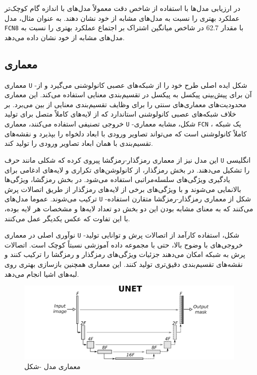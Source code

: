 در ارزیابی مدل‌ها با استفاده از شاخص دقت معمولاً مدل‌های با اندازه گام کوچک‌تر عملکرد بهتری را نسبت به مدل‌های مشابه از خود نشان دهند. به عنوان مثال، مدل
\verb*|FCN8|
با مقدار 62.7 در شاخص میانگین اشتراک بر اجتماع
عملکرد بهتری را نسبت به مدل‌های مشابه از خود نشان داده می‌دهد.

\subsection{معماری }

معماری
\verb*|U|
-شکل
\cite{ronneberger2015u}
ایده اصلی طرح خود را از شبکه‌های عصبی کانولوشنی می‌گیرد و از آن برای پیش‌بینی پیکسل به پیکسل
در تقسیم‌بندی معنایی استفاده می‌کند. این معماری محدودیت‌های معماری‌های سنتی را برای وظایف تقسیم‌بندی معنایی از بین می‌برد. بر خلاف شبکه‌های عصبی کانولوشنی استاندارد که از لایه‌های کاملاً متصل برای تولید خروجی تصنیفی استفاده می‌کنند، معماری 
\verb*|U|
-شکل، مشابه معماری
\verb*|FCN|
، یک شبکه کاملاً کانولوشنی است که می‌تواند تصاویر ورودی با ابعاد دلخواه را بپذیرد و نقشه‌های تقسیم‌بندی با همان ابعاد تصاویر ورودی را تولید کند.

این مدل نیز از معماری رمزگذار-رمزگشا پیروی کرده که شکلی مانند حرف
\verb*|U|
انگلیسی را تشکیل می‌دهند. در بخش رمزگذار، از کانولوشن‌های تکراری و لایه‌های ادغامی برای یادگیری ویژگی‌های سلسله‌مراتبی استفاده می‌شود. در بخش رمزگشا، ویژگی‌ها بالا‌نمایی می‌شوند و با ویژگی‌های برخی از لایه‌های رمزگذار از طریق اتصالات پرش ترکیب می‌شوند. عموما مدل‌های
\verb*|U|
-شکل از معماری رمزگذار-رمزگشا متقارن
\cite{mao2016image}
استفاده می‌کنند که به معنای مشابه بودن این دو بخش دو تعداد لایه‌ها و مشخصات هر لایه بوده، با این تفاوت که عکس یکدیگر عمل می‌کنند.

نوآوری اصلی در معماری
\verb*|U|
-شکل، استفاده کارآمد از اتصالات پرش و توانایی تولید خروجی‌های با وضوح بالا، حتی با مجموعه داده آموزشی نسبتاً کوچک است. اتصالات پرش به شبکه امکان می‌دهند جزئیات ویژگی‌های رمزگذار و رمزگشا را ترکیب کنند و نقشه‌های تقسیم‌بندی دقیق‌تری تولید کنند. این معماری همچنین بازسازی بهتری روی لبه‌های اشیا انجام می‌دهد.

\begin{figure}[ht]
	\includegraphics[width=\linewidth, height=0.2\textheight]{Images/Chapter2/UNET.png}
	\centering
	\caption{معماری مدل -شکل}
	\label{fig:fig6}
\end{figure}

